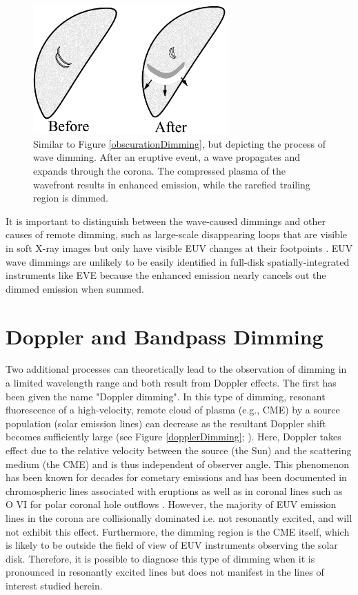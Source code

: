 \begin{figure}[!h]
    \caption[Schematic of obscuration dimming]{
        Similar to Figure \ref{obscurationDimming}, but depicting the process of wave dimming. After an eruptive event, a 
        wave propagates and expands through the corona. The compressed plasma of the wavefront results in enhanced emission,
        while the rarefied trailing region is dimmed. 
    }
    \begin{center}
        \includegraphics[width=75mm]{Images/WaveDimming.png}
    \end{center}
    \label{waveDimming}
\end{figure}

It is important to distinguish between the wave-caused dimmings and other causes of remote dimming, such as large-scale disappearing loops that are visible in soft X-ray images but only have visible EUV changes at their footpoints \citep{Pohjolainen2005}. EUV wave dimmings are unlikely to be easily identified in full-disk spatially-integrated instruments like EVE because the enhanced emission nearly cancels out the dimmed emission when summed. 

\section{Doppler and Bandpass Dimming}
Two additional processes can theoretically lead to the observation of dimming in a limited wavelength range and both result from Doppler effects. The first has been given the name "Doppler dimming". In this type of dimming, resonant fluorescence of a high-velocity, remote cloud of plasma (e.g., CME) by a source population (solar emission lines) can decrease as the resultant Doppler shift becomes sufficiently large (see Figure \ref{dopplerDimming}; \citealt{Hyder1970}). Here, Doppler takes effect due to the relative velocity between the source (the Sun) and the scattering medium (the CME) and is thus independent of observer angle. This phenomenon has been known for decades for cometary emissions \citep{Swings1941, Greenstein1958} and has been documented in chromospheric lines associated with eruptions \citep{Labrosse2012} as well as in coronal lines such as O VI for polar coronal hole outflows \citep{Giordano2000}. However, the majority of EUV emission lines in the corona are collisionally dominated i.e. not resonantly excited, and will not exhibit this effect. Furthermore, the dimming region is the CME itself, which is likely to be outside the field of view of EUV instruments observing the solar disk. Therefore, it is possible to diagnose this type of dimming when it is pronounced in resonantly excited lines but does not manifest in the lines of interest studied herein. 


